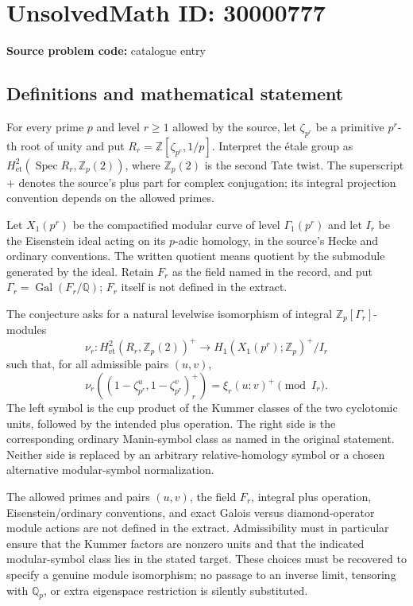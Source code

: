 \documentclass[11pt]{article}
\newcommand{\Z}{\mathbb{Z}}
\newcommand{\Q}{\mathbb{Q}}
\begin{document}
\section*{UnsolvedMath ID: 30000777}
\textbf{Source problem code:} catalogue entry
\subsection{Definitions and mathematical statement}
For every prime $p$ and level $r\geq1$ allowed by the source, let $\zeta_{p^r}$ be a primitive $p^r$-th root of unity and put $R_r=\Z[\zeta_{p^r},1/p]$. Interpret the étale group as $H^2_{\mathrm{et}}(\operatorname{Spec}R_r,\Z_p(2))$, where $\Z_p(2)$ is the second Tate twist. The superscript $+$ denotes the source's plus part for complex conjugation; its integral projection convention depends on the allowed primes.

Let $X_1(p^r)$ be the compactified modular curve of level $\Gamma_1(p^r)$ and let $I_r$ be the Eisenstein ideal acting on its $p$-adic homology, in the source's Hecke and ordinary conventions. The written quotient means quotient by the submodule generated by the ideal. Retain $F_r$ as the field named in the record, and put $\Gamma_r=\operatorname{Gal}(F_r/\Q)$; $F_r$ itself is not defined in the extract.

The conjecture asks for a natural levelwise isomorphism of integral $\Z_p[\Gamma_r]$-modules
\[
\nu_r:H^2_{\mathrm{et}}(R_r,\Z_p(2))^+
\longrightarrow H_1(X_1(p^r);\Z_p)^+/I_r
\]
such that, for all admissible pairs $(u,v)$,
\[
\nu_r\left((1-\zeta_{p^r}^{u},1-\zeta_{p^r}^{v})_r^+\right)
=\xi_r(u:v)^+\pmod{I_r}.
\]
The left symbol is the cup product of the Kummer classes of the two cyclotomic units, followed by the intended plus operation. The right side is the corresponding ordinary Manin-symbol class as named in the original statement. Neither side is replaced by an arbitrary relative-homology symbol or a chosen alternative modular-symbol normalization.

The allowed primes and pairs $(u,v)$, the field $F_r$, integral plus operation, Eisenstein/ordinary conventions, and exact Galois versus diamond-operator module actions are not defined in the extract. Admissibility must in particular ensure that the Kummer factors are nonzero units and that the indicated modular-symbol class lies in the stated target. These choices must be recovered to specify a genuine module isomorphism; no passage to an inverse limit, tensoring with $\Q_p$, or extra eigenspace restriction is silently substituted.
\end{document}
